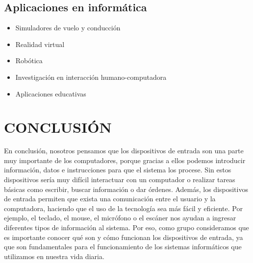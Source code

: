 \documentclass[12pt, letterpaper]{article}
\begin{document}
\subsection{Aplicaciones en informática}

\begin{itemize}
\item Simuladores de vuelo y conducción
\item Realidad virtual
\item Robótica
\item Investigación en interacción humano-computadora
\item Aplicaciones educativas
\end{itemize}

\newpage
\section{CONCLUSIÓN}

En conclusión, nosotros pensamos que los dispositivos de entrada son una parte muy importante de los computadores, porque gracias a ellos podemos introducir información, datos e instrucciones para que el sistema los procese. Sin estos dispositivos sería muy difícil interactuar con un computador o realizar tareas básicas como escribir, buscar información o dar órdenes.
Además, los dispositivos de entrada permiten que exista una comunicación entre el usuario y la computadora, haciendo que el uso de la tecnología sea más fácil y eficiente. Por ejemplo, el teclado, el mouse, el micrófono o el escáner nos ayudan a ingresar diferentes tipos de información al sistema.
Por eso, como grupo consideramos que es importante conocer qué son y cómo funcionan los dispositivos de entrada, ya que son fundamentales para el funcionamiento de los sistemas informáticos que utilizamos en nuestra vida diaria.
\end{document}
